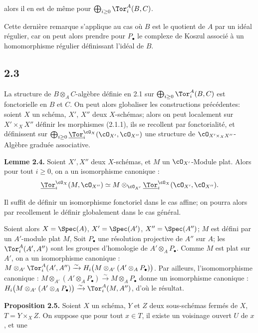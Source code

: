 alors il en est de même pour \(\bigoplus_{i\ge0}\Tor_i^A(B,C)\).

Cette dernière remarque s'applique au cas où \(B\) est le quotient de \(A\) par un idéal régulier, car on peut alors prendre pour \(P_\bullet\) le complexe de Koszul associé à un homomorphisme régulier définissant l'idéal de \(B\).

\subsection*{2.3}
La structure de \(B\otimes_A C\)-algèbre définie en 2.1 sur \(\bigoplus_{i\ge0}\Tor_i^A(B,C)\) est fonctorielle en \(B\) et \(C\). On peut alors globaliser les constructions précédentes: soient \(X\) un schéma, \(X'\), \(X''\) deux \(X\)-schémas; alors on peut localement sur \(X'\times_X X''\) définir les morphismes (2.1.1), ils se recollent par fonctorialité, et définissent sur \(\bigoplus_{i\ge0}\underline{\Tor}_i^{\cO_X}(\cO_{X'},\cO_{X''})\) une structure de \(\cO_{X'\times_X X''}\)-Algèbre graduée associative.

\textbf{Lemme 2.4.} Soient \(X',X''\) deux \(X\)-schémas, et \(M\) un \(\cO_{X'}\)-Module plat. Alors pour tout \(i\ge0\), on a un isomorphisme canonique :
\begin{equation}\notag
\underline{\Tor}_i^{\cO_X}(M,\cO_{X''})\simeq
M\otimes_{\cO_{X'}}\underline{\Tor}_i^{\cO_X}(\cO_{X'},\cO_{X''}).
\end{equation}

Il suffit de définir un isomorphisme fonctoriel dans le cas affine; on pourra alors par recollement le définir globalement dans le cas général.

Soient alors \(X=\Spec(A)\), \(X'=\Spec(A')\), \(X''=\Spec(A'')\); \(M\) est défini par un \(A'\)-module plat \(M\), Soit \(P_\bullet\) une résolution projective de \(A''\) sur \(A\); les \(\Tor_i^A(A',A'')\) sont les groupes d'homologie de \(A'\otimes_A P_\bullet\). Comme \(M\) est plat sur \(A'\), on a un isomorphisme canonique : \(M\otimes_{A'}\Tor_i^A(A',A'')\xrightarrow{\sim}H_i\bigl(M\otimes_{A'}(A'\otimes_A P_\bullet)\bigr)\). Par ailleurs, l'isomomorphisme canonique : \(M\otimes_{A'}(A'\otimes_A P_\bullet)\xrightarrow{\sim}M\otimes_A P_\bullet\) donne un isomorphisme canonique : \(H_i\bigl(M\otimes_{A'}(A'\otimes_A P_\bullet)\bigr)\xrightarrow{\sim}\Tor_i^A(M,A'')\), d'où le résultat.

\textbf{Proposition 2.5.} Soient \(X\) un schéma, \(Y\) et \(Z\) deux sous-schémas fermés de \(X\), \(T=Y\times_X Z\). On suppose que pour tout \(x\in T\), il existe un voisinage ouvert \(U\) de \(x\), et une
